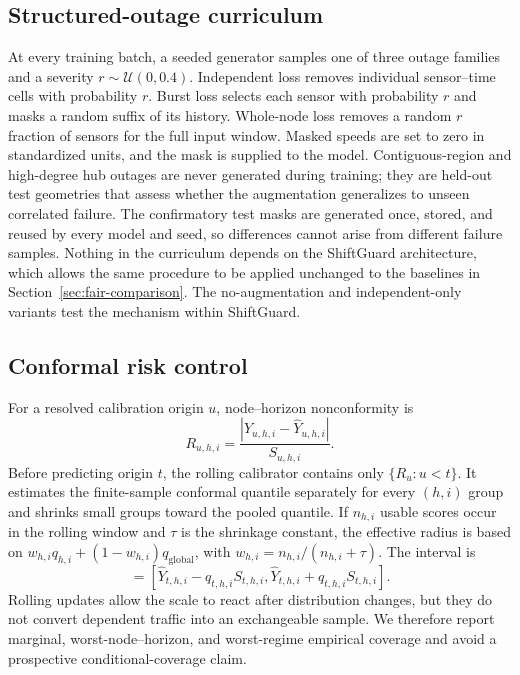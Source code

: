\documentclass[preprint,12pt]{elsarticle}
\begin{document}
\subsection{Structured-outage curriculum}
At every training batch, a seeded generator samples one of three outage
families and a severity $r\sim\mathcal{U}(0,0.4)$. Independent loss removes
individual sensor--time cells with probability $r$. Burst loss selects each
sensor with probability $r$ and masks a random suffix of its history. Whole-node
loss removes a random $r$ fraction of sensors for the full input window. Masked
speeds are set to zero in standardized units, and the mask is supplied to the
model. Contiguous-region and high-degree hub outages are never generated during
training; they are held-out test geometries that assess whether the
augmentation generalizes to unseen correlated failure. The confirmatory test
masks are generated once, stored, and reused by every model and seed, so
differences cannot arise from different failure samples. Nothing in the
curriculum depends on the ShiftGuard architecture, which allows the same
procedure to be applied unchanged to the baselines in
Section~\ref{sec:fair-comparison}. The no-augmentation and independent-only
variants test the mechanism within ShiftGuard.

\subsection{Conformal risk control}
\label{sec:evidence-gating-calibration-anchor}
For a resolved calibration origin $u$, node--horizon nonconformity is
\begin{equation}
 R_{u,h,i}=\frac{|Y_{u,h,i}-\hat Y_{u,h,i}|}{S_{u,h,i}}.
\end{equation}
Before predicting origin $t$, the rolling calibrator contains only
$\{R_u:u<t\}$. It estimates the finite-sample conformal quantile separately for
every $(h,i)$ group and shrinks small groups toward the pooled quantile. If
$n_{h,i}$ usable scores occur in the rolling window and $\tau$ is the shrinkage
constant, the effective radius is based on
$w_{h,i}q_{h,i}+(1-w_{h,i})q_{\mathrm{global}}$, with
$w_{h,i}=n_{h,i}/(n_{h,i}+\tau)$. The interval is
\begin{equation}
 [L_{t,h,i},U_{t,h,i}]=
 [\hat Y_{t,h,i}-q_{t,h,i}S_{t,h,i},
  \hat Y_{t,h,i}+q_{t,h,i}S_{t,h,i}].
\end{equation}
Rolling updates allow the scale to react after distribution changes, but they
do not convert dependent traffic into an exchangeable sample. We therefore
report marginal, worst-node--horizon, and worst-regime empirical coverage and
avoid a prospective conditional-coverage claim.
\end{document}
